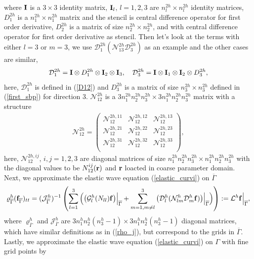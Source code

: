 where ${\bf I}$ is a $3\times3$ identity matrix, ${\bf I}_l$, $l = 1,2,3$ are $n_l^{2h}\times n_l^{2h}$ identity matrices, $D_1^{2h}$ is a $n_1^{2h}\times n_1^{2h}$ matrix and the stencil is central difference operator for first order derivative, $D_2^{2h}$ is a matrix of size $n_2^{2h}\times n_2^{2h}$, and with central difference operator for first order derivative as stencil. Then let's look at the terms with either $l = 3$ or $m = 3$, we use $\mathcal{D}_1^{2h}(\mathcal{N}_{13}^{2h}\mathcal{D}_3^{2h})$ as an example and the other cases are similar,
\begin{equation}\label{D13}
\mathcal{D}_1^{2h} = {\bf I}\otimes D_1^{2h} \otimes {\bf I}_2 \otimes {\bf I}_3,\ \ \ \mathcal{D}_3^{2h} ={\bf I}\otimes {\bf I}_1\otimes {\bf I}_2\otimes D_3^{2h},
\end{equation}
here, $\mathcal{D}_1^{2h}$ is defined in (\ref{D12}) and $D_3^{2h}$ is a matrix of size $n_3^{2h}\times n_3^{2h}$ defined in (\ref{first_sbp}) for direction $3$. $\mathcal{N}_{12}^{2h}$ is a $3n_1^{2h}n_2^{2h}n_3^{2h}\times3n_1^{2h}n_2^{2h}n_3^{2h}$ matrix with a structure
\begin{align}\label{N12}
\mathcal{N}_{12}^{2h}= \left(\begin{array}{ccc}
\mathscr{N}_{12}^{2h,11}&\mathscr{N}_{12}^{2h,12}& \mathscr{N}_{12}^{2h,13}\\
\mathscr{N}_{12}^{2h,21} & \mathscr{N}_{12}^{2h,22} & \mathscr{N}_{12}^{2h,23} \\
\mathscr{N}_{12}^{2h,31}&\mathscr{N}_{12}^{2h,32}&  \mathscr{N}_{12}^{2h,33}\\ \end{array}\right),
\end{align}
here, $\mathscr{N}_{12}^{2h,ij}$, $i,j = 1,2,3$ are diagonal matrices of size $n_1^{2h}n_2^{2h}n_3^{2h}\times n_1^{2h}n_2^{2h}n_3^{2h}$ with the diagonal values to be $N_{12}^{ij}({\bf r})$ and ${\bf r}$ loacted in coarse parameter domain. Next, we approximate the elastic wave equation (\ref{elastic_curvi}) on $\overline{\Gamma}$ 
\begin{equation}\label{elastic_semi_f}
\varrho^h_{\overline{\Gamma}} ({\bf f}_{\overline{\Gamma}})_{tt} =
( \mathcal{ J}_{\overline{\Gamma}}^{h})^{-1}\left(\sum_{l=1}^3\Big(\big(\mathcal{G}_l^{h}({N}_{ll}){\bf f}\big)\Big|_{\overline{\Gamma}}+\sum_{m=1,m\neq l}^3\big(\mathcal{D}_l^{h}(\mathcal{N}_{lm}^{h}\mathcal{D}_m^{h}{\bf f})\big)\Big|_{\overline{\Gamma}}\Big)\right) := \mathcal{L}^h{\bf f}\Big|_{\overline{\Gamma}},
\end{equation}
where ${\varrho}^{h}_{\overline{\Gamma}}$ and ${\mathcal{J}}^{h}_{\overline{\Gamma}}$ are $3n_1^hn_2^h(n_3^h-1)\times 3n_1^hn_2^h(n_3^h-1)$ diagonal matrices, which have similar definitions as in (\ref{rho_j}), but correspond to the grids in $\overline{\Gamma}$. Lastly, we approximate the elastic wave equation (\ref{elastic_curvi}) on $\Gamma$ with fine grid points by

